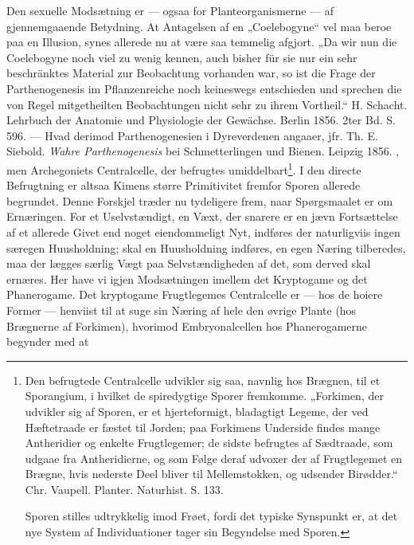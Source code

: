 \documentclass[11pt]{book}
\newcommand{\opage}[1]{\marginnote{\footnotesize\textit{[#1]}}}
\begin{document}
{Den sexuelle Modsætning er --- ogsaa for Planteorganismerne --- af
gjennemgaaende Betydning. At Antagelsen af en „Coelebogyne“ vel maa
beroe paa en Illusion, synes allerede nu at være saa temmelig afgjort.
„Da wir nun die Coelebogyne noch viel zu wenig kennen, auch bisher für
sie nur ein sehr beschränktes Material zur Beobachtung vorhanden war, so
ist die Frage der Parthenogenesis im Pflanzenreiche noch keineswegs
entschieden und sprechen die von Regel mitgetheilten Beobachtungen nicht
sehr zu ihrem Vortheil.“ H. Schacht. Lehrbuch der Anatomie und
Physiologie der Gewächse. Berlin 1856. 2ter Bd. S. 596. --- Hvad derimod
Parthenogenesien i Dyreverdenen angaaer, jfr. Th. E. Siebold.
\emph{Wahre Parthenogenesis} bei Schmetterlingen und Bienen. Leipzig
1856.
}, men Archegoniets
\opage{299} \setcounter{footnote}{0}%
Centralcelle, der befrugtes umiddelbart\footnote{%
Den befrugtede Centralcelle udvikler sig saa, navnlig hos Brægnen, til
et Sporangium, i hvilket de spiredygtige Sporer fremkomme. „Forkimen,
der udvikler sig af Sporen, er et hjerteformigt, bladagtigt Legeme, der
ved Hæftetraade er fæstet til Jorden; paa Forkimens Underside findes
mange Antheridier og enkelte Frugtlegemer; de sidste befrugtes af
Sædtraade, som udgaae fra Antheridierne, og som Følge deraf udvoxer der
af Frugtlegemet en Brægne, hvis nederste Deel bliver til Mellemstokken,
og udsender Birødder.“ Chr. Vaupell. Planter. Naturhist. S. 133.

Sporen stilles udtrykkelig imod Frøet, fordi det typiske Synspunkt er,
at det nye System af Individuationer tager sin Begyndelse med Sporen.
}. I den directe Befrugtning er altsaa Kimens større Primitivitet
fremfor Sporen allerede begrundet. Denne Forskjel træder nu tydeligere
frem, naar Spørgsmaalet er om Ernæringen. For et Uselvstændigt, en Væxt,
der snarere er en jævn Fortsættelse af et allerede Givet end noget
eiendommeligt Nyt, indføres der naturligviis ingen særegen
Huusholdning; skal en Huusholdning
\opage{300} \setcounter{footnote}{0}%
indføres, en egen Næring tilberedes, maa der lægges særlig Vægt paa
Selvstændigheden af det, som derved skal ernæres. Her have vi igjen
Modsætningen imellem det Kryptogame og det Phanerogame. Det kryptogame
Frugtlegemes Centralcelle er --- hos de hoiere Former ---
henviist til at suge sin Næring af hele den øvrige Plante (hos Brægnerne af
Forkimen), hvorimod Embryonalcellen hos Phanerogamerne begynder med at
\end{document}
